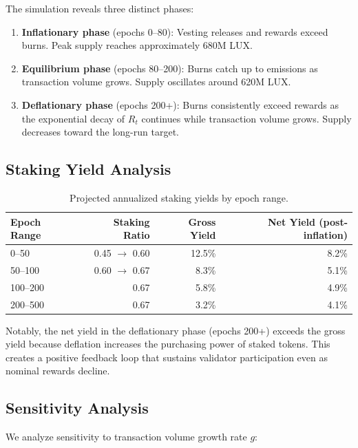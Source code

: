 The simulation reveals three distinct phases:
\begin{enumerate}
    \item \textbf{Inflationary phase} (epochs 0--80): Vesting releases and rewards exceed burns. Peak supply reaches approximately 680M LUX.
    \item \textbf{Equilibrium phase} (epochs 80--200): Burns catch up to emissions as transaction volume grows. Supply oscillates around 620M LUX.
    \item \textbf{Deflationary phase} (epochs 200+): Burns consistently exceed rewards as the exponential decay of $R_t$ continues while transaction volume grows. Supply decreases toward the long-run target.
\end{enumerate}

\subsection{Staking Yield Analysis}

\begin{table}[H]
\centering
\caption{Projected annualized staking yields by epoch range.}
\label{tab:yields}
\begin{tabular}{lrrr}
\toprule
\textbf{Epoch Range} & \textbf{Staking Ratio} & \textbf{Gross Yield} & \textbf{Net Yield (post-inflation)} \\
\midrule
0--50 & 0.45 $\to$ 0.60 & 12.5\% & 8.2\% \\
50--100 & 0.60 $\to$ 0.67 & 8.3\% & 5.1\% \\
100--200 & 0.67 & 5.8\% & 4.9\% \\
200--500 & 0.67 & 3.2\% & 4.1\% \\
\bottomrule
\end{tabular}
\end{table}

Notably, the net yield in the deflationary phase (epochs 200+) exceeds the gross yield because deflation increases the purchasing power of staked tokens. This creates a positive feedback loop that sustains validator participation even as nominal rewards decline.

\subsection{Sensitivity Analysis}

We analyze sensitivity to transaction volume growth rate $g$:

